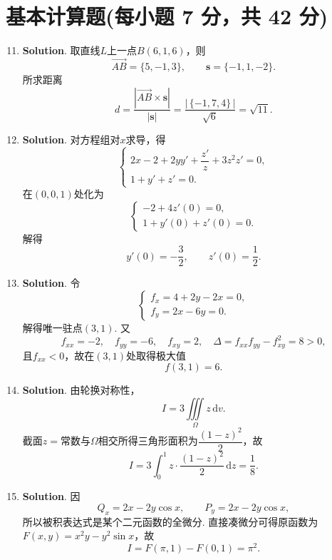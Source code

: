 \documentclass[../Main.tex]{subfiles}
\begin{document}
\section{基本计算题(每小题 7 分，共 42 分)}
\begin{enumerate}
    \setcounter{enumi}{10}
    \item \textbf{Solution}. 取直线$L$上一点$B(6,1,6)$，则
          \[
              \overrightarrow{AB}=\{5,-1,3\},\qquad \boldsymbol{s}=\{-1,1,-2\}.
          \]
          所求距离
          \[
              d=\frac{|\overrightarrow{AB}\times\boldsymbol{s}|}{|\boldsymbol{s}|}
              =\frac{|\,\{-1,7,4\}\,|}{\sqrt6}= \sqrt{11}.
          \]

    \item \textbf{Solution}. 对方程组对$x$求导，得
          \[
              \begin{cases}
                  2x-2+2yy'+\dfrac{z'}{z}+3z^{2}z'=0, \\
                  1+y'+z'=0.
              \end{cases}
          \]
          在$(0,0,1)$处化为
          \[
              \begin{cases}
                  -2+4z'(0)=0, \\
                  1+y'(0)+z'(0)=0.
              \end{cases}
          \]
          解得
          \[
              y'(0)=-\frac32,\qquad z'(0)=\frac12.
          \]

    \item \textbf{Solution}. 令
          \[
              \begin{cases}
                  f_{x}=4+2y-2x=0, \\
                  f_{y}=2x-6y=0.
              \end{cases}
          \]
          解得唯一驻点$(3,1)$.
          又
          \[
              f_{xx}=-2,\quad f_{yy}=-6,\quad f_{xy}=2,\quad \Delta=f_{xx}f_{yy}-f_{xy}^{2}=8>0,
          \]
          且$f_{xx}<0$，故在$(3,1)$处取得极大值
          \[
              f(3,1)=6.
          \]

    \item \textbf{Solution}. 由轮换对称性，
          \[
              I=3\iiint\limits_{\Omega}z\,\mathrm{d}v.
          \]
          截面$z=\text{常数}$与$\Omega$相交所得三角形面积为$\dfrac{(1-z)^{2}}{2}$，故
          \[
              I=3\int_{0}^{1}z\cdot \frac{(1-z)^{2}}{2}\,\mathrm{d}z=\frac18.
          \]

    \item \textbf{Solution}. 因
          \[
              Q_{x}=2x-2y\cos x,\qquad P_{y}=2x-2y\cos x,
          \]
          所以被积表达式是某个二元函数的全微分.
          直接凑微分可得原函数为$F(x,y)=x^{2}y-y^{2}\sin x$，故
          \[
              I=F(\pi,1)-F(0,1)=\pi^{2}.
          \]


\end{enumerate}
\end{document}
